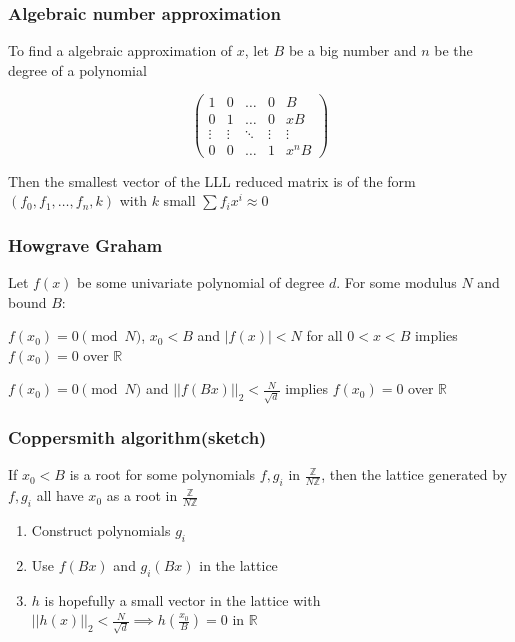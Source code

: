\documentclass{beamer}
\begin{document}
\begin{frame}
    \frametitle{Algebraic number approximation}
    To find a algebraic approximation of $x$, let $B$ be a big number and $n$ be the degree of a polynomial

    $$\begin{pmatrix}1&0&\dots&0&B\\0&1&\dots&0&xB\\\vdots&\vdots&\ddots&\vdots&\vdots\\0&0&\dots&1&x^nB\end{pmatrix}$$

    Then the smallest vector of the LLL reduced matrix is of the form $\left(f_0,f_1,\dots,f_n,k\right)$ with $k$ small $\sum f_ix^i\approx0$
\end{frame}

\begin{frame}
    \frametitle{Howgrave Graham}
    Let $f(x)$ be some univariate polynomial of degree $d$. For some modulus $N$ and bound $B$:

    $f\left(x_0\right)=0\pmod N$, $x_0<B$ and $|f(x)|<N$ for all $0<x<B$ implies $f\left(x_0\right)=0$ over $\mathbb R$\pause

    $f\left(x_0\right)=0\pmod N$ and $||f(Bx)||_2<\frac N{\sqrt{d}}$ implies $f\left(x_0\right)=0$ over $\mathbb R$
\end{frame}

\begin{frame}
    \frametitle{Coppersmith algorithm(sketch)}
    If $x_0<B$ is a root for some polynomials $f,g_i$ in $\frac{\mathbb Z}{N\mathbb Z}$, then the lattice generated by $f,g_i$ all have $x_0$ as a root in $\frac{\mathbb Z}{N\mathbb Z}$\pause

    \begin{enumerate}
        \item Construct polynomials $g_i$
        \item Use $f(Bx)$ and $g_i(Bx)$ in the lattice
        \item $h$ is hopefully a small vector in the lattice with $||h(x)||_2<\frac N{\sqrt{d}}\implies h\left(\frac{x_0}B\right)=0$ in $\mathbb R$
    \end{enumerate}
\end{frame}
\end{document}
